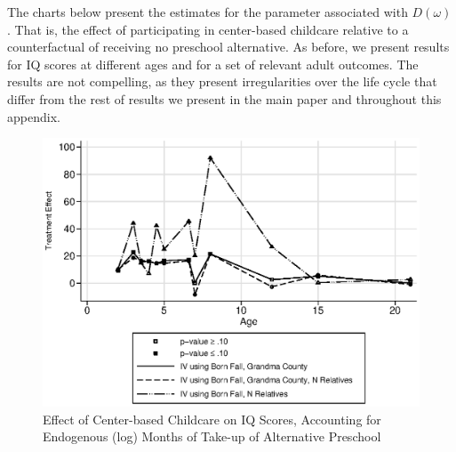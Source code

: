 \begin{appendices}
\noindent The charts below present the estimates for the parameter associated with $D(\omega)$. That is, the effect of participating in center-based childcare relative to a counterfactual of receiving no preschool alternative. As before, we present results for IQ scores at different ages and for a set of relevant adult outcomes. The results are not compelling, as they present irregularities over the life cycle that differ from the rest of results we present in the main paper and throughout this appendix.

\begin{figure}[H]
		\caption{Effect of Center-based Childcare on IQ Scores, Accounting for Endogenous (log) Months of Take-up of Alternative Preschool} \label{output/appendixplots/Q_cf_te.eps}
		\includegraphics[width=.7\columnwidth]{output/appendixplots/ins_inter_logQ_iv_te.eps}
\end{figure}


\end{appendices}
